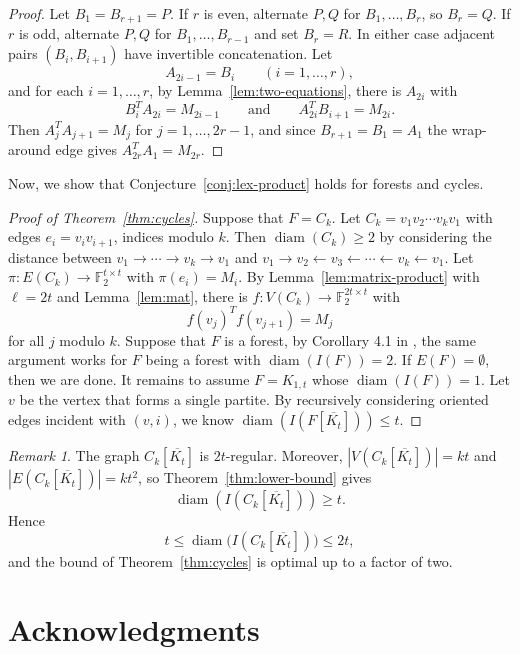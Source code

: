 \documentclass[11pt]{article}
\theoremstyle{remark}
\newtheorem{remark}[theorem]{Remark}
\DeclareMathOperator{\diam}{diam}
\newcommand{\F}{\mathbb{F}}
\begin{document}
\begin{proof}
Let $B_1=B_{r+1}=P$.
If $r$ is even, alternate $P,Q$ for $B_1,
\ldots,B_r$, so $B_r=Q$.
If $r$ is odd, alternate $P,Q$ for $B_1,
\ldots,B_{r-1}$ and set $B_r=R$.
In either case adjacent pairs $(B_i,B_{i+1})$ have invertible concatenation. 
Let 
\[
  A_{2i-1}=B_i\qquad (i=1,\ldots,r),
\]
and for each $i=1,\ldots,r$, by  Lemma~\ref{lem:two-equations}, there is  $A_{2i}$  with
\[
  B_i^T A_{2i}=M_{2i-1}
  \qquad\text{and}\qquad
  A_{2i}^T B_{i+1}=M_{2i}.
\]
Then $A_j^T A_{j+1}=M_j$ for $j=1,\ldots,2r-1$, and since
$B_{r+1}=B_1=A_1$ the wrap-around edge gives
$A_{2r}^T A_1=M_{2r}$.
\end{proof} 


Now, we show that Conjecture~\ref{conj:lex-product} holds for forests and cycles. 
\begin{proof}[Proof of Theorem~\ref{thm:cycles}]

Suppose that $F=C_k$. Let  $C_k=v_1v_2\cdots v_kv_1$ with edges $e_i=v_iv_{i+1}$, indices modulo $k$.  Then $\diam(C_k)\ge 2$  by considering the distance between $v_1\to \cdots \to v_k\to v_1$ and   $v_1\to v_2\leftarrow v_3\leftarrow \cdots \leftarrow v_k\leftarrow v_1$.   
Let $\pi:E(C_k)\to\F_2^{t\times t}$ with $\pi(e_i)=M_i$.
By Lemma~\ref{lem:matrix-product} with $\ell=2t$ and Lemma~\ref{lem:mat},  there is
$f:V(C_k)\to\F_2^{2t\times t}$ with
\[
  f(v_j)^T f(v_{j+1})=M_j
\]
for all $j$ modulo $k$.   Suppose that $F$ is a forest, by Corollary 4.1 in \cite{HavetHorschRambaud}, the same argument works for $F$ being a forest with $\diam(I(F))=2$. If $E(F)=\emptyset$, then we are done. It remains to  assume $F=K_{1,t}$ whose $\diam(I(F))=1$. Let $v$ be the vertex that forms a single partite. By recursively considering oriented edges incident with $(v,i)$, we know $\diam(I(F[\overline{K_t}]))\le t$. 
\end{proof}

\begin{remark}\label{rem:cycle-lower}
The graph $C_k[\overline{K_t}]$ is $2t$-regular.
Moreover, $|V(C_k[\overline{K_t}])|=kt$ and $|E(C_k[\overline{K_t}])|=kt^2$, so Theorem~\ref{thm:lower-bound} gives
\[
  \diam(I(C_k[\overline{K_t}]))\ge t.
\]
Hence
\[
  t\le \diam\bigl(I(C_k[\overline{K_t}])\bigr)\le2t,
\]
and the bound of Theorem~\ref{thm:cycles} is optimal up to a factor of two.
\end{remark}


\section*{Acknowledgments}
\end{document}
